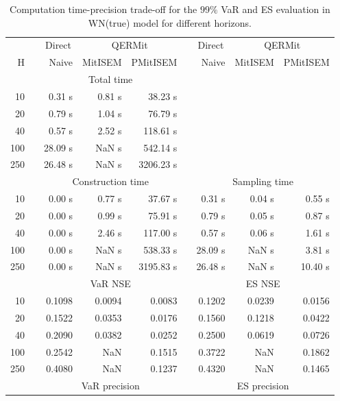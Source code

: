 { \renewcommand{\arraystretch}{1.3} 
\begin{table}[h] 
\centering 
\caption{Computation time-precision trade-off for the  $99\%$ VaR and ES evaluation in WN(true) model for different horizons.} 
\label{tab:time_precision_WN_ML} 
\begin{tabular}{rr rrr r rrr}  
 & & \multicolumn{1}{c}{Direct} & \multicolumn{2}{c}{QERMit}&  & \multicolumn{1}{c}{Direct} & \multicolumn{2}{c}{QERMit} \\ \cline{3-5} \cline{7-9} 
 H & & Naive & MitISEM & PMitISEM & & Naive & MitISEM & PMitISEM \\ \hline 
 & & \multicolumn{3}{c}{Total time}  \\ \cline{3-5} 
10 & & 0.31 s & 0.81 s & 38.23 s  \\ 
20 & & 0.79 s & 1.04 s & 76.79 s  \\ 
40 & & 0.57 s & 2.52 s & 118.61 s  \\ 
100 & & 28.09 s &  NaN s & 542.14 s  \\ 
250 & & 26.48 s &  NaN s & 3206.23 s  \\ 
\hline 
 & & \multicolumn{3}{c}{Construction time} & & \multicolumn{3}{c}{ Sampling time} \\ \cline{3-5}  \cline{7-9}
10 & & 0.00 s & 0.77 s & 37.67 s &&  0.31 s & 0.04 s & 0.55 s \\ 
20 & & 0.00 s & 0.99 s & 75.91 s &&  0.79 s & 0.05 s & 0.87 s \\ 
40 & & 0.00 s & 2.46 s & 117.00 s &&  0.57 s & 0.06 s & 1.61 s \\ 
100 & & 0.00 s &  NaN s & 538.33 s &&  28.09 s &  NaN s & 3.81 s \\ 
250 & & 0.00 s &  NaN s & 3195.83 s &&  26.48 s &  NaN s & 10.40 s \\ 
\hline 
 & & \multicolumn{3}{c}{VaR NSE} &&  \multicolumn{3}{c}{ES NSE} \\ \cline{3-5}  \cline{7-9}
10 && 0.1098  & 0.0094  & 0.0083 && 0.1202  & 0.0239  & 0.0156  \\ 
20 && 0.1522  & 0.0353  & 0.0176 && 0.1560  & 0.1218  & 0.0422  \\ 
40 && 0.2090  & 0.0382  & 0.0252 && 0.2500  & 0.0619  & 0.0726  \\ 
100 && 0.2542  &    NaN  & 0.1515 && 0.3722  &    NaN  & 0.1862  \\ 
250 && 0.4080  &    NaN  & 0.1237 && 0.4320  &    NaN  & 0.1465  \\ 
\hline 
 & & \multicolumn{3}{c}{VaR precision} &&  \multicolumn{3}{c}{ES precision} \\ \cline{3-5}  \cline{7-9}

\end{tabular}
\end{table}}
